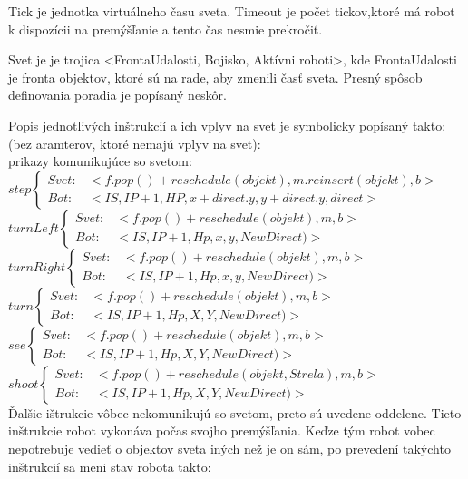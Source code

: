\begin{definicia}
Tick je jednotka virtuálneho času sveta. Timeout je počet tickov,ktoré má robot k dispozícii na premýšľanie a tento čas nesmie prekročiť.
\end{definicia}

\begin{definicia} 
Svet je je trojica <FrontaUdalosti, Bojisko, Aktívni roboti>, kde FrontaUdalosti je fronta objektov, ktoré sú na rade, aby zmenili časť sveta. Presný spôsob definovania poradia je popísaný neskôr.
\end{definicia}
Popis jednotlivých inštrukcií a ich vplyv na svet je symbolicky popísaný takto: (bez aramterov, ktoré nemajú vplyv na svet):\\
prikazy komunikujúce so svetom:\\
$ step \left\{ \begin{array}{ll} Svet: & <f.pop()+reschedule(objekt),m.reinsert(objekt), b> \\ Bot: & < IS, IP + 1, HP, x+direct.y, y+ direct.y, direct> \end{array}\right.  $\\
$ turnLeft \left\{ \begin{array}{lc} Svet: & <f.pop()+reschedule(objekt),m, b> \\ Bot: & < IS, IP + 1, Hp, x, y, NewDirect)> \end{array}\right.  $\\
$ turnRight \left\{ \begin{array}{lc} Svet: & <f.pop()+reschedule(objekt),m, b> \\ Bot: & < IS, IP + 1, Hp, x, y, NewDirect)> \end{array}\right.  $\\
$turn  \left\{\begin{array}{lc} Svet: & <f.pop()+reschedule(objekt),m,b> \\ Bot: & <IS, IP+1, Hp, X, Y, NewDirect)> \end{array}\right. $\\
$see  \left\{\begin{array}{lc} Svet: & <f.pop()+reschedule(objekt),m,b> \\ Bot: & <IS, IP+1, Hp, X, Y, NewDirect)> \end{array}\right. $\\
$shoot \left\{\begin{array}{lc} Svet: & <f.pop()+reschedule(objekt,Strela),m,b> \\ Bot: & <IS, IP+1, Hp, X, Y, NewDirect)> \end{array}\right. $\\
\indent
Ďalšie ištrukcie vôbec nekomunikujú so svetom, preto sú uvedene oddelene. Tieto inštrukcie robot vykonáva počas svojho premýšľania. Keďze tým robot vobec nepotrebuje vedieť o objektov sveta iných než je on sám, po prevedení takýchto inštrukcií sa meni stav robota takto:

